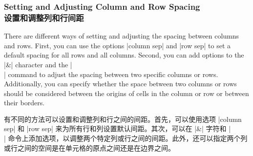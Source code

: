 \begin{codeexample}[]
\end{codeexample}

\begin{codeexample}[]
\end{codeexample}


\subsubsection{Setting and Adjusting Column and Row Spacing\\设置和调整列和行间距}

There are different ways of setting and adjusting the spacing between columns
and rows. First, you can use the options |column sep| and |row sep| to set a
default spacing for all rows and all columns. Second, you can add options to
the |&| character and the |\\| command to adjust the spacing between two
specific columns or rows. Additionally, you can specify whether the space
between two columns or rows should be considered between the origins of cells
in the column or row or between their borders.

有不同的方法可以设置和调整列和行之间的间距。首先，可以使用选项 |column sep| 和 |row sep| 来为所有行和列设置默认间距。其次，可以在 |&| 字符和 |\\| 命令上添加选项，以调整两个特定列或行之间的间距。此外，还可以指定两个列或行之间的空间是在单元格的原点之间还是在边界之间。

